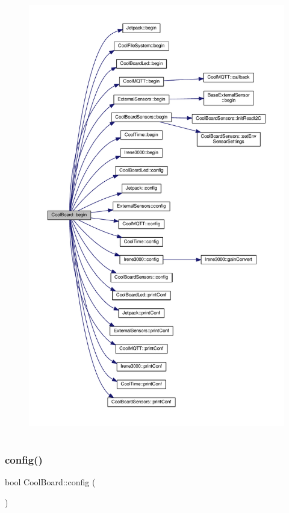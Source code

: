 \begin{figure}[H]
\begin{center}
\leavevmode
\includegraphics[height=550pt]{classCoolBoard_acba7c5aef7268b2c0044bdb54d3b9d76_cgraph}
\end{center}
\end{figure}
\mbox{\label{classCoolBoard_a583a874c09c07e70a6eb9229fc4beddb}} 
\subsubsection{\texorpdfstring{config()}{config()}}
{\footnotesize\ttfamily bool Cool\+Board\+::config (\begin{DoxyParamCaption}{ }\end{DoxyParamCaption})}

